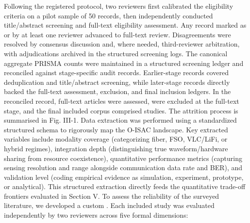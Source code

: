 {}Following the registered protocol, two reviewers first calibrated the eligibility criteria on a pilot sample of 50 records, then independently conducted title/abstract screening and full-text eligibility assessment. Any record marked as  or  by at least one reviewer advanced to full-text review. Disagreements were resolved by consensus discussion and, where needed, third-reviewer arbitration, with adjudications archived in the structured screening logs.\markdownRendererParagraphSeparator
{}The canonical aggregate PRISMA counts were maintained in a structured screening ledger and reconciled against stage-specific audit records. Earlier-stage records covered deduplication and title/abstract screening, while later-stage records directly backed the full-text assessment, exclusion, and final inclusion ledgers. In the reconciled record,  full-text articles were assessed,  were excluded at the full-text stage, and the final included corpus comprised  studies. The attrition process is summarised in Fig. III-1.\markdownRendererInterblockSeparator
{}\markdownRendererInterblockSeparator
{}\markdownRendererParagraphSeparator
{}
\markdownRendererSectionEnd \markdownRendererSectionBegin
{}\markdownRendererInterblockSeparator
{}Data extraction was performed using a standardized structured schema to rigorously map the O-ISAC landscape. Key extracted variables include modality coverage (categorizing fiber, FSO, VLC/LiFi, or hybrid regimes), integration depth (distinguishing true waveform/hardware sharing from resource coexistence), quantitative performance metrics (capturing sensing resolution and range alongside communication data rate and BER), and validation level (coding empirical evidence as simulation, experiment, prototype, or analytical). This structured extraction directly feeds the quantitative trade-off frontiers evaluated in Section V.\markdownRendererInterblockSeparator
{}
\markdownRendererSectionEnd \markdownRendererSectionBegin
{}\markdownRendererInterblockSeparator
{}To assess the reliability of the surveyed literature, we developed a custom . Each included study was evaluated independently by two reviewers across five formal dimensions:\markdownRendererInterblockSeparator
